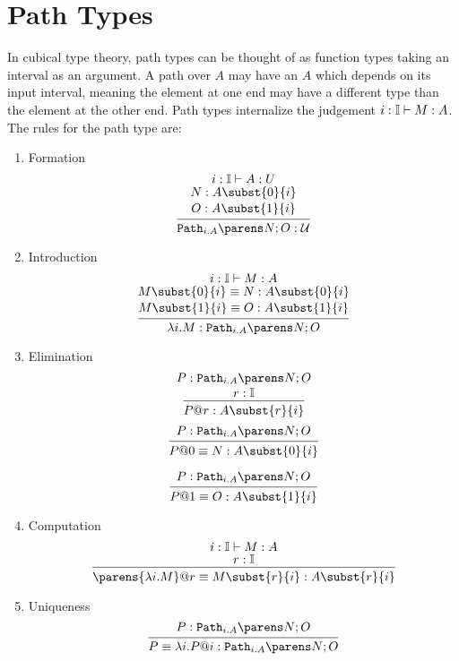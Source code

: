 \documentclass[11pt]{article}
\begin{document}
\section{Path Types}

In cubical type theory, path types can be thought of as function types taking an interval as an argument. A path over $A$ may have an $A$ which depends on its input interval, meaning the element at one end may have a different type than the element at the other end. Path types internalize the judgement $\oftype{\oftype{i}{\bI}}{M}{A}$. The rules for the path type are:
\begin{enumerate}
    \item Formation
\[
    \begin{prooftree}
        \hypo{\oftype{\oftype{i}{\bI}}{A}{U}}
        \infer[no rule]1{\oftype{N}{A\subst{0}{i}}}
        \infer[no rule]1{\oftype{O}{A\subst{1}{i}}}
        \infer1{\oftype{\pathtypes{i.A}{N}{O}}{\UU}}
    \end{prooftree}
\]
    \item Introduction
\[
    \begin{prooftree}
        \hypo{\oftype{\oftype{i}{\bI}}{M}{A}}
        \infer[no rule]1{\oftype{\eqtype{M\subst{0}{i}}{N}}{A\subst{0}{i}}}
        \infer[no rule]1{\oftype{\eqtype{M\subst{1}{i}}{O}}{A\subst{1}{i}}}
        \infer1{\oftype{\lam{i}{M}}{\pathtypes{i.A}{N}{O}}}
    \end{prooftree}
\]
    \item Elimination
\[
    \begin{prooftree}
        \hypo{\oftype{P}{\pathtypes{i.A}{N}{O}}}
        \infer[no rule]1{\oftype{r}{\bI}}
        \infer1{\oftype{P@r}{A\subst{r}{i}}}
    \end{prooftree}
\]
\[
    \begin{prooftree}
        \hypo{\oftype{P}{\pathtypes{i.A}{N}{O}}}
        \infer1{\oftype{\eqtype{P@0}{N}}{A\subst{0}{i}}}
    \end{prooftree}
\]

\[
    \begin{prooftree}
        \hypo{\oftype{P}{\pathtypes{i.A}{N}{O}}}
        \infer1{\oftype{\eqtype{P@1}{O}}{A\subst{1}{i}}}
    \end{prooftree}
\]
    \item Computation
\[
    \begin{prooftree}
        \hypo{\oftype{\oftype{i}{\bI}}{M}{A}}
        \infer[no rule]1{\oftype{r}{\bI}}
        \infer1{\oftype{\eqtype{\parens{\lam{i}{M}}@r}{M\subst{r}{i}}}{A\subst{r}{i}}}
    \end{prooftree}
\]
    \item Uniqueness
\[
    \begin{prooftree}
        \hypo{\oftype{P}{\pathtypes{i.A}{N}{O}}}
        \infer1{\oftype{\eqtype{P}{\lam{i}{P}@i}}{\pathtypes{i.A}{N}{O}}}
    \end{prooftree}
\]
\end{enumerate}
\end{document}
